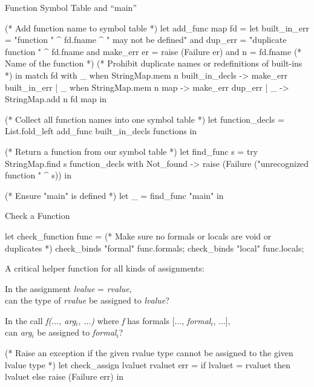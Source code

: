 \documentclass{plt}
\begin{document}
\begin{frame}[fragile=singleslide]{Function Symbol Table and ``main''}

\begin{ocaml}
(* Add function name to symbol table *)
let add_func map fd = 
  let built_in_err = "function " ^ fd.fname ^ " may not be defined"
  and dup_err = "duplicate function " ^ fd.fname
  and make_err er = raise (Failure er)
  and n = fd.fname (* Name of the function *)
  (* Prohibit duplicate names or redefinitions of built-ins *)
  in match fd with
       _ when StringMap.mem n built_in_decls -> make_err built_in_err
     | _ when StringMap.mem n map -> make_err dup_err  
     | _ ->  StringMap.add n fd map 
in

(* Collect all function names into one symbol table *)
let function_decls = List.fold_left add_func built_in_decls functions
in

(* Return a function from our symbol table *)
let find_func s = 
  try StringMap.find s function_decls
  with Not_found -> raise (Failure ("unrecognized function " ^ s))
in

(* Ensure "main" is defined *)
let _ = find_func "main" in
\end{ocaml}
\end{frame}

\begin{frame}[fragile=singleslide]{Check a Function}
\begin{ocaml}
let check_function func =
  (* Make sure no formals or locals are void or duplicates *)
  check_binds "formal" func.formals;
  check_binds "local" func.locals;    
\end{ocaml}

A critical helper function for all kinds of assignments:

In the assignment \emph{lvalue} = \emph{rvalue}, \\ can the type of
\emph{rvalue} be assigned to \emph{lvalue}?

In the call \emph{f($\ldots$, arg$_i$, $\ldots$)} where \emph{f} has
formals [$\ldots$, \emph{formal$_i$}, $\ldots$], \\ can
\emph{arg$_i$} be assigned to \emph{formal$_i$}?

\begin{ocaml}
  (* Raise an exception if the given rvalue type cannot
     be assigned to the given lvalue type *)
let check_assign lvaluet rvaluet err =
   if lvaluet = rvaluet then lvaluet else raise (Failure err)
in   
\end{ocaml}

\end{frame}
\end{document}
